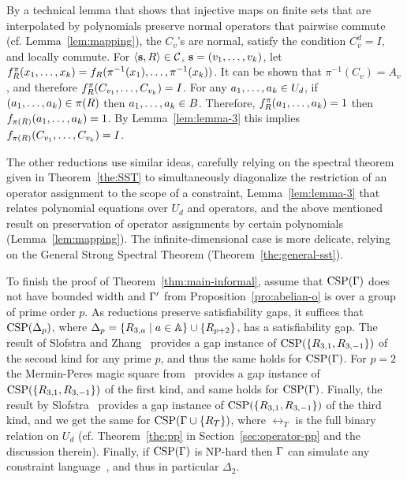 \documentclass[11pt,letter]{article}
\begin{document}
By a technical lemma that shows that injective maps on finite sets that are interpolated
by polynomials preserve normal operators that pairwise commute (cf.
Lemma~\ref{lem:mapping}), 
the $C_v$'s are normal, satisfy the condition $C_v^d=I$, and locally commute. For $\langle {\bf s},R \rangle\in{\mathcal C}$, ${\bf s}=(v _1,\ldots, v _{k})$, let $f^\pi_R(x _1,\ldots, x _{k})=f_R(\pi^{-1}(x_1),\ldots,\pi^{-1}(x_k))$. 
It can be shown that $\pi^{-1}(C_v)=A_v$, and therefore $f^\pi_R(C_{v_1},\ldots, C_{v_k})=I$. For any $a _1,\ldots, a _{k}\in U_d$, if $(a _1,\ldots, a _{k})\in\pi(R)$ then $a _1,\ldots, a _{k}\in B$. Therefore, $f^\pi_R(a _1,\ldots, a _{k})=1$ then $f_{\pi(R)}(a _1,\ldots, a _{k})=1$. By Lemma~\ref{lem:lemma-3} this implies $f_{\pi(R)}(C_{v_1},\ldots, C_{v_k})=I$.


The other reductions use similar ideas, carefully relying on the spectral
theorem given in Theorem~\ref{the:SST} to simultaneously diagonalize the
restriction of an operator assignment to the scope of a constraint,
Lemma~\ref{lem:lemma-3} that relates polynomial equations over $U_d$ and
operators, and the above mentioned result on
preservation of operator assignments by certain polynomials (Lemma~\ref{lem:mapping}).
The infinite-dimensional case is more delicate, relying on the General Strong
Spectral Theorem (Theorem~\ref{the:general-sst}).

\smallskip
To finish the proof of Theorem~\ref{thm:main-informal}, assume that
${\rm CSP}(\Gamma)$ does not have bounded width and $\Gamma'$ from
Proposition~\ref{pro:abelian-o} is over a group of prime order $p$. As reductions preserve satisfiability gaps, it suffices that
${\rm CSP}(\Delta_p)$, where $\Delta_p=\{R_{3,a}\mid a\in{\mathbb A}\}\cup\{R_{p+2}\}$, has a
satisfiability gap. The result of
Slofstra and Zhang~\cite{SZ24:personal} provides a gap instance of ${\rm CSP}(\{R_{3,1},R_{3,-1}\})$ of the 
second kind for any prime $p$, and thus the same holds for ${\rm CSP}(\Gamma)$.
For $p=2$ the Mermin-Peres magic square from~\cite{Mermin1990simple}
provides a gap instance of ${\rm CSP}(\{R_{3,1},R_{3,-1}\})$ of the first kind,
and same holds for ${\rm CSP}(\Gamma)$.
Finally, the result by Slofstra~\cite{Slofstra20:jams} provides a gap instance of
${\rm CSP}(\{R_{3,1},R_{3,-1}\})$ of the third kind, and we get the same for
${\rm CSP}(\Gamma\cup\{R_T\})$, where $\rel_T$ is the full binary relation on $U_d$ (cf.
Theorem~\ref{the:pp} in Section~\ref{sec:operator-pp} and the discussion
therein). Finally, if ${\rm CSP}(\Gamma)$ is NP-hard then $\Gamma$ can simulate any
constraint language~\cite{Bulatov05:classifying}, and thus in particular $\Delta_2$.
\end{document}
